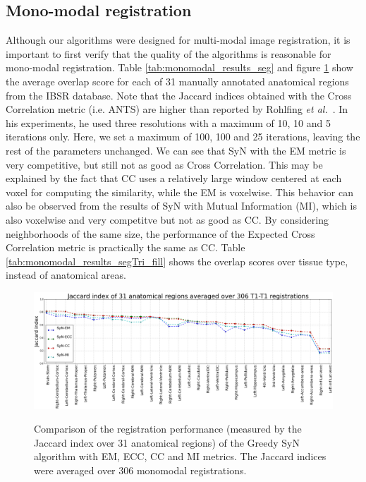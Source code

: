 \subsection{Mono-modal registration}
Although our algorithms were designed for multi-modal image registration, it is important to first verify that the quality of the algorithms is reasonable for mono-modal registration.
Table \ref{tab:monomodal_results_seg} and figure \ref{fig:mono_graph_seg} show the average overlap score for each of 31 manually annotated anatomical regions from the IBSR database.
Note that the Jaccard indices obtained with the Cross Correlation metric (i.e. ANTS) are higher than reported by Rohlfing {\it et al.}~\cite{Rohlfing2012}. In his experiments, he used
three resolutions with a maximum of 10, 10 and 5 iterations only. Here, we set a maximum of 100, 100 and 25 iterations, leaving the rest of the parameters
unchanged. We can see that SyN with the EM metric is very competitive, but still not as good as Cross Correlation. This may be explained by the fact that CC uses a relatively large
window centered at each voxel for computing the similarity, while the EM is voxelwise. This behavior can also be observed from the results of SyN with Mutual Information (MI), which is also
voxelwise and very competitve but not as good as CC. By considering neighborhoods of the same size, the performance of the Expected Cross Correlation metric is practically the
same as CC. Table \ref{tab:monomodal_results_segTri_fill} shows the overlap scores over tissue type, instead of anatomical areas.




\begin{figure}[H]
\centering
\includegraphics[width=1.0\linewidth]{./images/mono_lines_seg.png}\\
\caption{Comparison of the registration performance (measured by the Jaccard index over 31 anatomical regions) of the Greedy SyN algorithm with EM, ECC, CC and MI metrics. The Jaccard
indices were averaged over 306 monomodal registrations.}
\label{fig:mono_graph_seg}
\end{figure}

